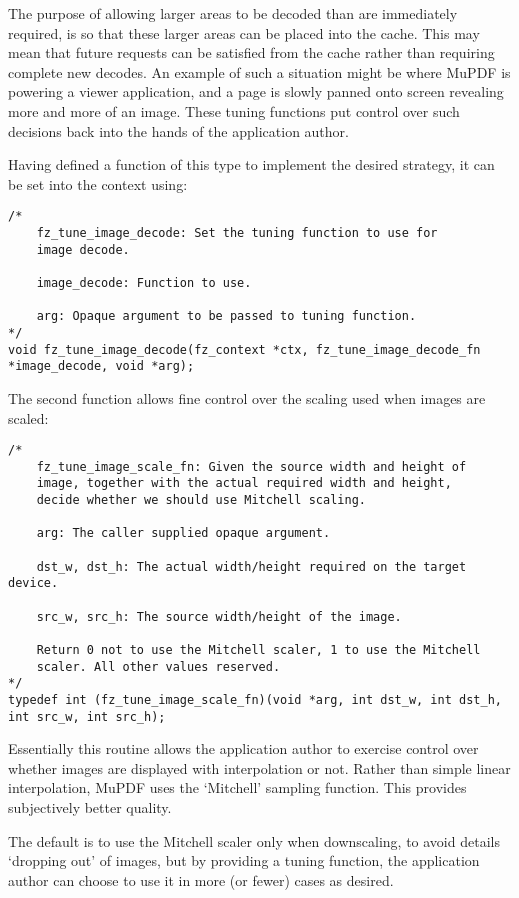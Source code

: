\documentclass[oneside]{book}
\begin{document}
The purpose of allowing larger areas to be decoded than are immediately required, is so that these larger areas can be placed into the cache. This may mean that future requests can be satisfied from the cache rather than requiring complete new decodes. An example of such a situation might be where MuPDF is powering a viewer application, and a page is slowly panned onto screen revealing more and more of an image. These tuning functions put control over such decisions back into the hands of the application author.

Having defined a function of this type to implement the desired strategy, it can be set into the context using:

\begin{lstlisting}
/*
	fz_tune_image_decode: Set the tuning function to use for
	image decode.

	image_decode: Function to use.

	arg: Opaque argument to be passed to tuning function.
*/
void fz_tune_image_decode(fz_context *ctx, fz_tune_image_decode_fn *image_decode, void *arg);
\end{lstlisting}

The second function allows fine control over the scaling used when images are scaled:

\begin{lstlisting}
/*
	fz_tune_image_scale_fn: Given the source width and height of
	image, together with the actual required width and height,
	decide whether we should use Mitchell scaling.

	arg: The caller supplied opaque argument.

	dst_w, dst_h: The actual width/height required on the target device.

	src_w, src_h: The source width/height of the image.

	Return 0 not to use the Mitchell scaler, 1 to use the Mitchell
	scaler. All other values reserved.
*/
typedef int (fz_tune_image_scale_fn)(void *arg, int dst_w, int dst_h, int src_w, int src_h);
\end{lstlisting}

Essentially this routine allows the application author to exercise control over whether images are displayed with interpolation or not. Rather than simple linear interpolation, MuPDF uses the `Mitchell' sampling function. This provides subjectively better quality.

The default is to use the Mitchell scaler only when downscaling, to avoid details `dropping out' of images, but by providing a tuning function, the application author can choose to use it in more (or fewer) cases as desired.
\end{document}
